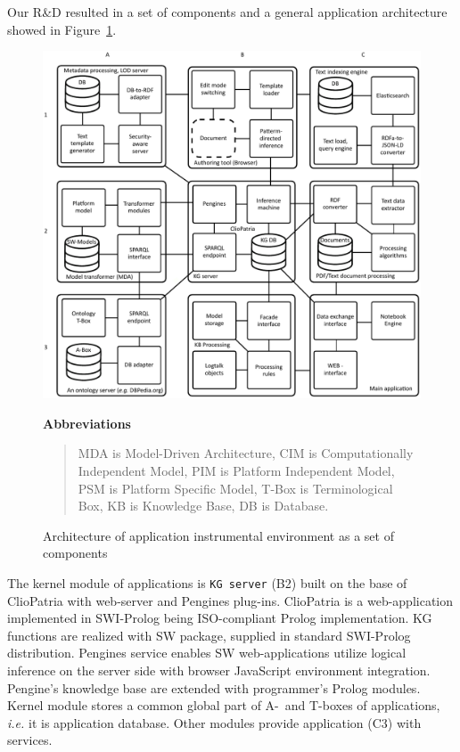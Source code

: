 \documentclass[
]{ceurart}
\begin{document}
Our R\&D resulted in a set of components and a general application architecture showed in Figure~\ref{fig:arch-services}.
\begin{figure}[bth]
  \begin{center}
    \includegraphics[width=0.9\linewidth]{architecture-mda-lod-ext-general.pdf}
  \end{center}
  \begin{center}
      \textbf{Abbreviations}%
    \end{center}
    \begin{quote}\scriptsize
      MDA is Model-Driven Architecture,
      CIM is Computationally Independent Model,
      PIM is Platform Independent Model,
      PSM is Platform Specific Model,
      T-Box is Terminological Box,
      KB is Knowledge Base,
      DB is Database.
    \end{quote}
  \caption{Architecture of application instrumental environment as a set of components}
  \label{fig:arch-services}
\end{figure}
The kernel module of applications is \texttt{KG server} (B2) built on the base of ClioPatria \cite{cliopatria} with web-server and Pengines plug-ins.  ClioPatria is a web-application implemented in SWI-Prolog \cite{swi} being ISO-compliant Prolog implementation.  KG functions are realized with SW package, supplied in standard SWI-Prolog distribution.  Pengines service enables SW web-applications utilize logical inference on the server side \cite{pengines} with browser JavaScript environment integration.  Pengine's knowledge base are extended with programmer's Prolog modules.  Kernel module stores a common global part of A-~and T-boxes of applications, \emph{i.e.} it is application database.  Other modules provide application (C3) with services.
\end{document}
